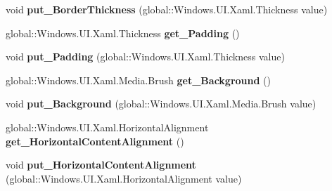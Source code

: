 \begin{DoxyCompactItemize}
void {\bfseries put\+\_\+\+Border\+Thickness} (global\+::\+Windows.\+U\+I.\+Xaml.\+Thickness value)
\item 
\mbox{\label{interface_windows_1_1_u_i_1_1_xaml_1_1_controls_1_1_i_content_presenter4_a7e1575cbfaeb5ad47ddbf4528c2a01fe}} 
global\+::\+Windows.\+U\+I.\+Xaml.\+Thickness {\bfseries get\+\_\+\+Padding} ()
\item 
\mbox{\label{interface_windows_1_1_u_i_1_1_xaml_1_1_controls_1_1_i_content_presenter4_af18a60ec485bc0df6feb66d44efadbb0}} 
void {\bfseries put\+\_\+\+Padding} (global\+::\+Windows.\+U\+I.\+Xaml.\+Thickness value)
\item 
\mbox{\label{interface_windows_1_1_u_i_1_1_xaml_1_1_controls_1_1_i_content_presenter4_a89f236cfa72e4352ba5ff825a2ec9f5a}} 
global\+::\+Windows.\+U\+I.\+Xaml.\+Media.\+Brush {\bfseries get\+\_\+\+Background} ()
\item 
\mbox{\label{interface_windows_1_1_u_i_1_1_xaml_1_1_controls_1_1_i_content_presenter4_a052301695cb479ae10c998256c35d352}} 
void {\bfseries put\+\_\+\+Background} (global\+::\+Windows.\+U\+I.\+Xaml.\+Media.\+Brush value)
\item 
\mbox{\label{interface_windows_1_1_u_i_1_1_xaml_1_1_controls_1_1_i_content_presenter4_a09a08983436a09edb0fcc2b73c746b45}} 
global\+::\+Windows.\+U\+I.\+Xaml.\+Horizontal\+Alignment {\bfseries get\+\_\+\+Horizontal\+Content\+Alignment} ()
\item 
\mbox{\label{interface_windows_1_1_u_i_1_1_xaml_1_1_controls_1_1_i_content_presenter4_ae336a6680b3867b8c159d802caafbe13}} 
void {\bfseries put\+\_\+\+Horizontal\+Content\+Alignment} (global\+::\+Windows.\+U\+I.\+Xaml.\+Horizontal\+Alignment value)
\item 
\mbox{\label{interface_windows_1_1_u_i_1_1_xaml_1_1_controls_1_1_i_content_presenter4_acb36f5224b57a6975ff61aeee1ab5f74}} 

\end{DoxyCompactItemize}
